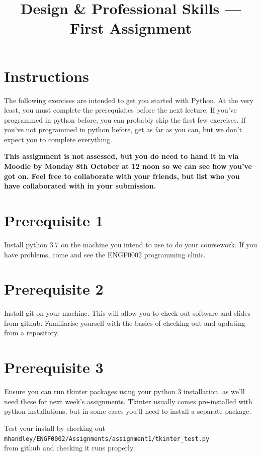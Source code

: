 \documentclass{article}
\title{Design \& Professional Skills --- First Assignment}
\author{}
\date{}
\begin{document}
\maketitle

\section*{Instructions}

The following exercises are intended to get you started with Python.
At the very least, you must complete the prerequisites before the next
lecture.  If you've programmed in python before, you can probably skip
the first few exercises.  If you've not programmed in python before,
get as far as you can, but we don't expect you to complete everything.

\textbf{This assignment is not assessed, but you do need to hand it in
  via Moodle by Monday 8th October at 12 noon so we can see how you've
  got on.  Feel free to collaborate with your friends, but list who
  you have collaborated with in your submission.}

\section*{Prerequisite 1}

Install python 3.7 on the machine you intend to use to do your
coursework.  If you have problems, come and see the ENGF0002
programming clinic.

\section*{Prerequisite 2}

Install git on your machine.  This will allow you to check out
software and slides from github.  Familiarise yourself with the basics
of checking out and updating from a repository.

\section*{Prerequisite 3}

Ensure you can run tkinter packages using your python 3 installation,
as we'll need these for next week's assignments.  Tkinter usually
comes pre-installed with python installations, but in some cases you'll need to
install a separate package.

\vspace{0.1in}\noindent Test your install by checking out\\
\texttt{mhandley/ENGF0002/Assignments/assignment1/tkinter\_test.py}\\
from github and checking it runs properly.
\end{document}
